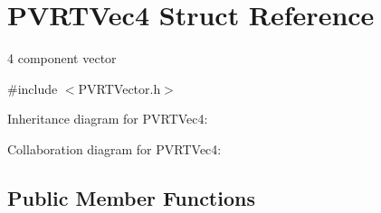 \hypertarget{struct_p_v_r_t_vec4}{\section{P\+V\+R\+T\+Vec4 Struct Reference}
\label{struct_p_v_r_t_vec4}
}


4 component vector  




{\ttfamily \#include $<$P\+V\+R\+T\+Vector.\+h$>$}



Inheritance diagram for P\+V\+R\+T\+Vec4\+:


Collaboration diagram for P\+V\+R\+T\+Vec4\+:
\subsection*{Public Member Functions}
